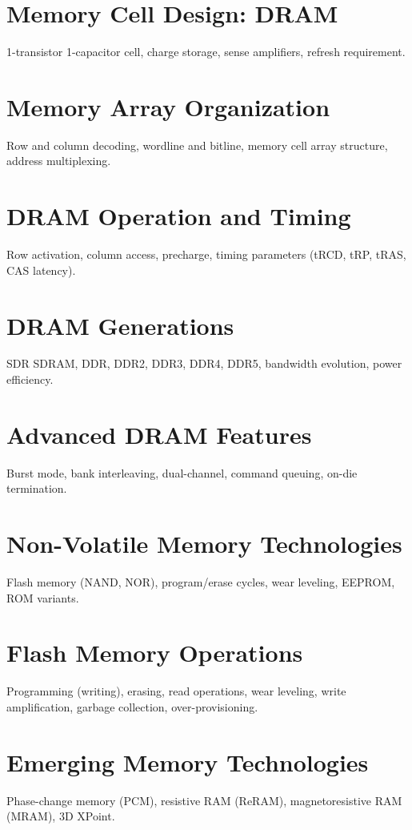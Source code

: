 \chapter{Memory Cell Design: DRAM}
1-transistor 1-capacitor cell, charge storage, sense amplifiers, refresh requirement.

\chapter{Memory Array Organization}
Row and column decoding, wordline and bitline, memory cell array structure, address multiplexing.

\chapter{DRAM Operation and Timing}
Row activation, column access, precharge, timing parameters (tRCD, tRP, tRAS, CAS latency).

\chapter{DRAM Generations}
SDR SDRAM, DDR, DDR2, DDR3, DDR4, DDR5, bandwidth evolution, power efficiency.

\chapter{Advanced DRAM Features}
Burst mode, bank interleaving, dual-channel, command queuing, on-die termination.

\chapter{Non-Volatile Memory Technologies}
Flash memory (NAND, NOR), program/erase cycles, wear leveling, EEPROM, ROM variants.

\chapter{Flash Memory Operations}
Programming (writing), erasing, read operations, wear leveling, write amplification, garbage collection, over-provisioning.

\chapter{Emerging Memory Technologies}
Phase-change memory (PCM), resistive RAM (ReRAM), magnetoresistive RAM (MRAM), 3D XPoint.


